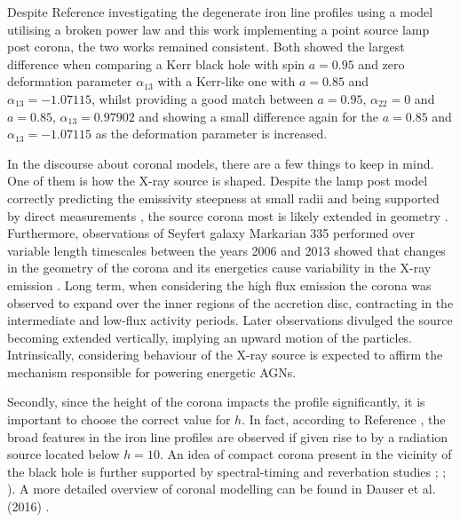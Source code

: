 \documentclass[fleqn,usenatbib,useAMS]{mnras}
\begin{document}
Despite Reference \cite{johannsen2014x} investigating the degenerate iron line profiles using a model utilising a broken power law and this work implementing a point source lamp post corona, the two works remained consistent. Both showed the largest difference when comparing a Kerr black hole with spin $a = 0.95$ and zero deformation parameter $\alpha_{13}$ with a Kerr-like one with $a = 0.85$ and $\alpha_{13} = -1.07115$, whilst providing a good match between $a = 0.95$,  $\alpha_{22} = 0$ and $a = 0.85$, $\alpha_{13} = 0.97902$ and showing a small difference again for the $a = 0.85$ and $\alpha_{13} = -1.07115$ as the deformation parameter is increased. 

In the discourse about coronal models, there are a few things to keep in mind. One of them is how the X-ray source is shaped. Despite the lamp post model correctly predicting the emissivity steepness at small radii and being supported by direct measurements \cite{wilkins2012understanding}, the source corona most is likely extended in geometry \cite{wilkins2015driving}. Furthermore, observations of Seyfert galaxy Markarian 335 performed over variable length timescales between the years 2006 and 2013 showed that changes in the geometry of the corona and its energetics cause variability in the X-ray emission \cite{wilkins2015driving}. Long term, when considering the high flux emission the corona was observed to expand over the inner regions of the accretion disc, contracting in the intermediate and low-flux activity periods. Later observations divulged the source becoming extended vertically, implying an upward motion of the particles. Intrinsically, considering behaviour of the X-ray source is expected to affirm the mechanism responsible for powering energetic AGNs.

Secondly, since the height of the corona impacts the profile significantly, it is important to choose the correct value for $h$. In fact, according to Reference \cite{fabian2014determination}, the broad features in the iron line profiles are observed if given rise to by a radiation source located below $h=10$. An idea of compact corona present in the vicinity of the black hole is further supported by spectral-timing and reverbation studies \cite{cackett2014modelling}; \cite{kara2013discovery}; \cite{uttley2014x}). A more detailed overview of coronal modelling can be found in Dauser et al. (2016) \cite{dauser2016relativistic}.
\end{document}
